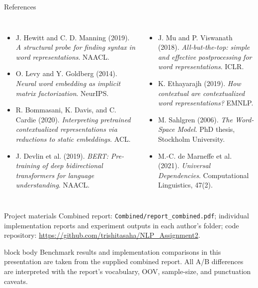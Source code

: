 \documentclass[aspectratio=169,9pt,t]{beamer}
\newcommand{\tightitem}{\setlength{\itemsep}{0.12em}\setlength{\parskip}{0pt}\setlength{\topsep}{0.08em}}
\begin{document}
\begin{frame}{References}
\footnotesize
\begin{columns}[T,onlytextwidth]
\begin{itemize}\tightitem
\item J. Hewitt and C. D. Manning (2019). \emph{A structural probe for finding syntax in word representations}. NAACL.
\item O. Levy and Y. Goldberg (2014). \emph{Neural word embedding as implicit matrix factorization}. NeurIPS.
\item R. Bommasani, K. Davis, and C. Cardie (2020). \emph{Interpreting pretrained contextualized representations via reductions to static embeddings}. ACL.
\item J. Devlin et al. (2019). \emph{BERT: Pre-training of deep bidirectional transformers for language understanding}. NAACL.
\end{itemize}
\begin{itemize}\tightitem
\item J. Mu and P. Viswanath (2018). \emph{All-but-the-top: simple and effective postprocessing for word representations}. ICLR.
\item K. Ethayarajh (2019). \emph{How contextual are contextualized word representations?} EMNLP.
\item M. Sahlgren (2006). \emph{The Word-Space Model}. PhD thesis, Stockholm University.
\item M.-C. de Marneffe et al. (2021). \emph{Universal Dependencies}. Computational Linguistics, 47(2).
\end{itemize}
\end{columns}
\vspace{0.22em}
\begin{exampleblock}{Project materials}
\small Combined report: \texttt{Combined/report\_combined.pdf}; individual implementation reports and experiment outputs in each author's folder; code repository: \url{https://github.com/trishitasaha/NLP_Assignment2}.
\end{exampleblock}
\vspace{0.3em}
\begin{beamercolorbox}[rounded=true,sep=0.8ex,wd=\linewidth]{block body}
\scriptsize Benchmark results and implementation comparisons in this presentation are taken from the supplied combined report. All A/B differences are interpreted with the report's vocabulary, OOV, sample-size, and punctuation caveats.
\end{beamercolorbox}
\end{frame}
\end{document}
